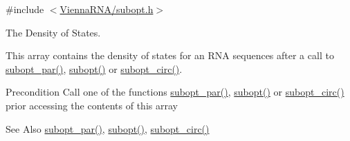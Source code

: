 {\ttfamily \#include $<$\hyperlink{subopt_8h}{Vienna\-R\-N\-A/subopt.\-h}$>$}



The Density of States. 

This array contains the density of states for an R\-N\-A sequences after a call to \hyperlink{group__subopt__wuchty_gaa1e1e7031a948ebcb39a9d58d1e9842c}{subopt\-\_\-par()}, \hyperlink{group__subopt__wuchty_ga700f662506a233e42dd7fda74fafd40e}{subopt()} or \hyperlink{group__subopt__wuchty_ga8634516e4740e0b6c9a46d2bae940340}{subopt\-\_\-circ()}.

\begin{DoxyPrecond}{Precondition}
Call one of the functions \hyperlink{group__subopt__wuchty_gaa1e1e7031a948ebcb39a9d58d1e9842c}{subopt\-\_\-par()}, \hyperlink{group__subopt__wuchty_ga700f662506a233e42dd7fda74fafd40e}{subopt()} or \hyperlink{group__subopt__wuchty_ga8634516e4740e0b6c9a46d2bae940340}{subopt\-\_\-circ()} prior accessing the contents of this array 
\end{DoxyPrecond}
\begin{DoxySeeAlso}{See Also}
\hyperlink{group__subopt__wuchty_gaa1e1e7031a948ebcb39a9d58d1e9842c}{subopt\-\_\-par()}, \hyperlink{group__subopt__wuchty_ga700f662506a233e42dd7fda74fafd40e}{subopt()}, \hyperlink{group__subopt__wuchty_ga8634516e4740e0b6c9a46d2bae940340}{subopt\-\_\-circ()} 
\end{DoxySeeAlso}
